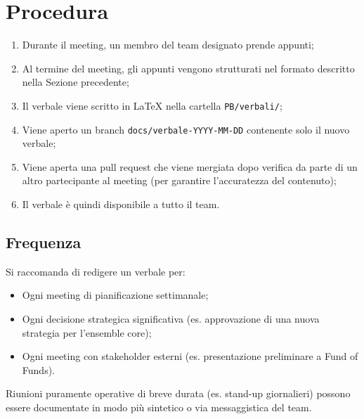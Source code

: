 \section{Procedura}

\begin{enumerate}
  \item Durante il meeting, un membro del team designato prende appunti;
  \item Al termine del meeting, gli appunti vengono strutturati nel formato descritto nella Sezione precedente;
  \item Il verbale viene scritto in LaTeX nella cartella \texttt{PB/verbali/};
  \item Viene aperto un branch \texttt{docs/verbale-YYYY-MM-DD} contenente solo il nuovo verbale;
  \item Viene aperta una pull request che viene mergiata dopo verifica da parte di un altro partecipante al meeting (per garantire l'accuratezza del contenuto);
  \item Il verbale è quindi disponibile a tutto il team.
\end{enumerate}

\subsection{Frequenza}

Si raccomanda di redigere un verbale per:

\begin{itemize}
  \item Ogni meeting di pianificazione settimanale;
  \item Ogni decisione strategica significativa (es. approvazione di una nuova strategia per l'ensemble core);
  \item Ogni meeting con stakeholder esterni (es. presentazione preliminare a Fund of Funds).
\end{itemize}

Riunioni puramente operative di breve durata (es. stand-up giornalieri) possono essere documentate in modo più sintetico o via messaggistica del team.
